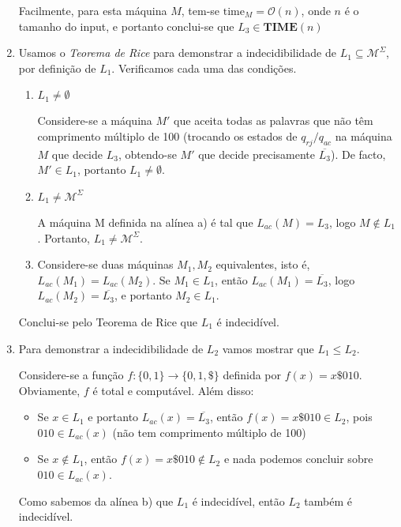 \documentclass[a4paper,12pt]{article}
\begin{document}
\begin{enumerate}[label=\alph*)]
    Facilmente, para esta máquina $M$, tem-se $\text{time}_M = \mathcal{O}(n)$, onde $n$ é o tamanho do input, e portanto conclui-se que $L_3 \in \textbf{TIME}(n)$ 
    
    \vspace{0.5cm}
    \item Usamos o \textit{Teorema de Rice} para demonstrar a indecidibilidade de $L_1 \subseteq \mathcal{M}^\Sigma$, por definição de $L_1$. Verificamos cada uma das condições.
    
    \begin{enumerate}[label=\arabic*)]
      \item \underline{$L_1 \neq \emptyset$}
      
      Considere-se a máquina $M'$ que aceita todas as palavras que não têm comprimento múltiplo de 100 (trocando os estados de $q_{rj}/q_{ac}$ na máquina $M$ que decide $L_3$, obtendo-se $M'$ que decide precisamente $\overline{L_3}$). De facto, $M' \in L_1$, portanto $L_1 \neq \emptyset$.
      
      \vspace{0.3cm}
      \item \underline{$L_1 \neq \mathcal{M}^\Sigma$}
      
      A máquina M definida na alínea a) é tal que $L_{ac}(M) = L_3$, logo $M \notin L_1$. Portanto, $L_1 \neq \mathcal{M}^\Sigma$.
      
      \vspace{0.3cm}
      \item Considere-se duas máquinas $M_1, M_2$ equivalentes, isto é, $L_{ac}(M_1) = L_{ac}(M_2)$. Se $M_1 \in L_1$, então $L_{ac}(M_1) = \overline{L_3}$, logo $L_{ac}(M_2) = \overline{L_3}$, e portanto $M_2 \in L_1$.
    \end{enumerate}

    Conclui-se pelo Teorema de Rice que $L_1$ é indecidível.

    \vspace{0.5cm}
    \item Para demonstrar a indecidibilidade de $L_2$ vamos mostrar que $L_1 \leq L_2$.

    Considere-se a função $f: \{0,1\} \to \{0,1, \$ \}$ definida por $f(x) = x\$010$. Obviamente, $f$ é total e computável.
    Além disso:

    \begin{itemize}
      \item Se $x \in L_1$ e portanto $L_{ac}(x)=\overline{L_3}$, então $f(x) = x\$010 \in L_2$, pois $010 \in L_{ac}(x)$ (não tem comprimento múltiplo de 100)
      
      \vspace{0.3cm}
      \item Se $x \notin L_1$, então $f(x) = x\$010 \notin L_2$ e nada podemos concluir sobre $010 \in L_{ac}(x)$.
      
    \end{itemize}

    Como sabemos da alínea b) que $L_1$ é indecidível, então $L_2$ também é indecidível.
\end{enumerate}
\end{document}
